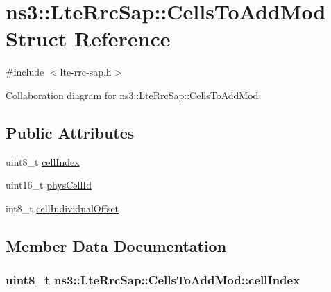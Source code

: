\hypertarget{structns3_1_1LteRrcSap_1_1CellsToAddMod}{}\section{ns3\+:\+:Lte\+Rrc\+Sap\+:\+:Cells\+To\+Add\+Mod Struct Reference}
\label{structns3_1_1LteRrcSap_1_1CellsToAddMod}


{\ttfamily \#include $<$lte-\/rrc-\/sap.\+h$>$}



Collaboration diagram for ns3\+:\+:Lte\+Rrc\+Sap\+:\+:Cells\+To\+Add\+Mod\+:
\subsection*{Public Attributes}
\begin{DoxyCompactItemize}
\item 
uint8\+\_\+t \hyperlink{structns3_1_1LteRrcSap_1_1CellsToAddMod_aee90d1e667723bf732f8ff72068e7653}{cell\+Index}
\item 
uint16\+\_\+t \hyperlink{structns3_1_1LteRrcSap_1_1CellsToAddMod_af464d86622df4ae8343121a1ef229b66}{phys\+Cell\+Id}
\item 
int8\+\_\+t \hyperlink{structns3_1_1LteRrcSap_1_1CellsToAddMod_a735203ed0992b79612612429c657f21f}{cell\+Individual\+Offset}
\end{DoxyCompactItemize}


\subsection{Member Data Documentation}
\subsubsection[{\texorpdfstring{cell\+Index}{cellIndex}}]{\setlength{\rightskip}{0pt plus 5cm}uint8\+\_\+t ns3\+::\+Lte\+Rrc\+Sap\+::\+Cells\+To\+Add\+Mod\+::cell\+Index}\hypertarget{structns3_1_1LteRrcSap_1_1CellsToAddMod_aee90d1e667723bf732f8ff72068e7653}{}\label{structns3_1_1LteRrcSap_1_1CellsToAddMod_aee90d1e667723bf732f8ff72068e7653}
